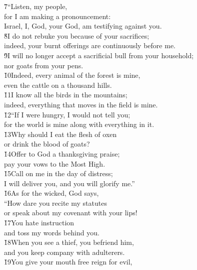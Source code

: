\begin{poetry}
\poeml \v{7}``Listen, my people, \\
\poemll    for I am making a pronouncement: \\
\poemlll       Israel, I, God, your God, am testifying against you. \\
\poeml \v{8}I do not rebuke you because of your sacrifices; \\
\poemll    indeed, your burnt offerings are continuously before me. \\
\poeml \v{9}I will no longer accept a sacrificial bull from your household; \\
\poemll    nor goats from your pens. \\
\poeml \v{10}Indeed, every animal of the forest is mine, \\
\poemll    even the cattle on a thousand hills. \\
\poeml \v{11}I know all the birds in the mountains; \\
\poemll    indeed, everything that moves in the field is mine. \\
\poeml \v{12}``If I were hungry, I would not tell you; \\
\poemll    for the world is mine along with everything in it. \\
\poeml \v{13}Why should I eat the flesh of oxen \\
\poemll    or drink the blood of goats? \\
\poeml \v{14}Offer to God a thanksgiving praise; \\
\poemll    pay your vows to the Most High. \\
\poeml \v{15}Call on me in the day of distress; \\
\poemll    I will deliver you, and you will glorify me.'' \\
\poeml \v{16}As for the wicked, God says, \\
\poeml ``How dare you recite my statutes \\
\poemll    or speak about my covenant with your lips! \\
\poeml \v{17}You hate instruction \\
\poemll    and toss my words behind you. \\
\poeml \v{18}When you see a thief, you befriend him, \\
\poemll    and you keep company with adulterers. \\
\poeml \v{19}You give your mouth free reign for evil, \\

\end{poetry}

